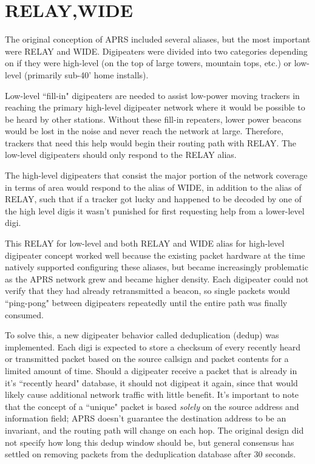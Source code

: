 \section{RELAY,WIDE}

The original conception of APRS included several aliases, but the most important were RELAY
and WIDE. Digipeaters were divided into two categories depending on if they were high-level
(on the top of large towers, mountain tops, etc.) or low-level (primarily sub-40' home installs).

Low-level ``fill-in" digipeaters are needed to assist low-power moving trackers in reaching the
primary high-level digipeater network where it would be possible to be heard by other stations.
Without these fill-in repeaters, lower power beacons would be lost in the noise and never reach the 
network at large. Therefore, trackers that need this help would begin their routing path with RELAY.
The low-level digipeaters should only respond to the RELAY alias.

The high-level digipeaters that consist the major portion of the network coverage in terms of area
would respond to the alias of WIDE, in addition to the alias of RELAY, such that if a tracker got
lucky and happened to be decoded by one of the high level digis it wasn't punished for first requesting 
help from a lower-level digi.

This RELAY for low-level and both RELAY and WIDE alias for high-level digipeater concept worked well
because the existing packet hardware at the time natively supported configuring these aliases, but
became increasingly problematic as the APRS network grew and became higher density. Each digipeater
could not verify that they had already retransmitted a beacon, so single packets would ``ping-pong" 
between digipeaters repeatedly until the entire path was finally consumed.

To solve this, a new digipeater behavior called deduplication (dedup) was implemented.
Each digi is expected to store a checksum of every recently heard or transmitted packet
based on the source callsign and packet contents for a limited amount of time. 
Should a digipeater receive a packet that is already in it's ``recently heard" database,
it should not digipeat it again, since that would likely cause additional network traffic
with little benefit.
It's important to note that the concept of a ``unique" packet is based \emph{solely} on the
source address and information field; APRS doesn't guarantee the destination address to be
an invariant, and the routing path will change on each hop.
The original design did not specify how long this dedup window should be,
but general consensus has settled on removing packets from the deduplication database after 30 seconds.

